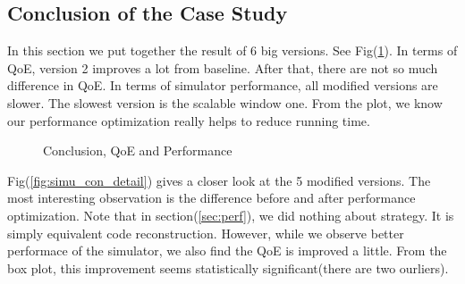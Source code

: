\documentclass[11pt,a4paper]{article}
\begin{document}
\subsection{Conclusion of the Case Study}
\label{sec:simu_con}

In this section we put together the result of 6 big versions. 
See Fig(\ref{fig:simu_con}). In terms of QoE, version 2 improves
a lot from baseline. After that, there are not so much difference 
in QoE. In terms of simulator performance, all modified versions 
are slower. The slowest version is the scalable window one. From 
the plot, we know our performance optimization really helps to 
reduce running time. 

\begin{figure}[htb]
\centering
	\caption{Conclusion, QoE and Performance}
	\label{fig:simu_con}
\end{figure}

Fig(\ref{fig:simu_con_detail}) gives a closer look at the 5 modified versions. 
The most interesting observation is the difference before and after 
performance optimization. Note that in section(\ref{sec:perf}), 
we did nothing about strategy. It is simply equivalent code reconstruction.
However, while we observe better performace of the simulator, we also 
find the QoE is improved a little. From the box plot, this improvement 
seems statistically significant(there are two ourliers). 
\end{document}

